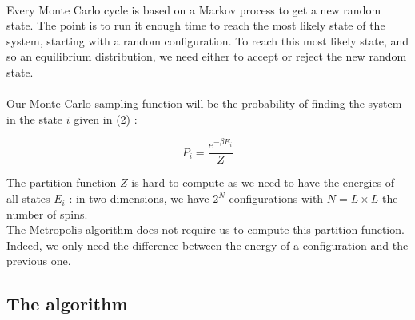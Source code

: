 \documentclass[a4paper, twoside, 11pt]{report}
\theoremstyle{theorem}
\theoremstyle{remark}
\theoremstyle{exemple}
\begin{document}
            \paragraph{}Every Monte Carlo cycle is based on a Markov process to get a new random state. The point is to run it enough time to reach the most likely state of the system, starting with a random configuration. To reach this most likely state, and so an equilibrium distribution, we need either to accept or reject the new random state. 
            
            \paragraph{}Our Monte Carlo sampling function will be the probability of finding the system in the state $i$ given in (2) :
                    
                \begin{equation*}
                    P_i = \frac{e^{-\beta E_i}}{Z}
                \end{equation*}
                
            The partition function $Z$ is hard to compute as we need to have the energies of all states $E_i$ : in two dimensions, we have $2^N$ configurations with $N=L\times L$ the number of spins. \\
            The Metropolis algorithm does not require us to compute this partition function. Indeed, we only need the difference between the energy of a configuration and the previous one.
            
        \subsection{The algorithm}
        
\end{document}
